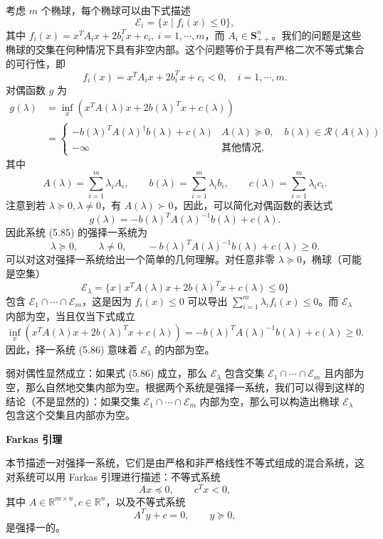 \documentclass[UTF8,12pt,a4paper,fontset=fandol]{ctexart}
\begin{document}
考虑 $m$ 个椭球，每个椭球可以由下式描述
\[
\mathcal{E}_i=\{x\mid f_i(x)\leq 0\},
\]
其中 $f_i(x)=x^TA_ix+2b_i^Tx+c_i,\ i=1,\cdots,m$，而 $A_i\in\mathbf{S}_{++}^n$。我们的问题是这些椭球的交集在何种情况下具有非空内部。这个问题等价于具有严格二次不等式集合的可行性，即
\begin{equation}
f_i(x)=x^TA_ix+2b_i^Tx+c_i<0,\quad i=1,\cdots,m.
\tag{5.85}
\end{equation}
对偶函数 $g$ 为
\[
\begin{aligned}
g(\lambda)
&=\inf_x\left(x^TA(\lambda)x+2b(\lambda)^Tx+c(\lambda)\right)\\
&=
\begin{cases}
-b(\lambda)^TA(\lambda)^\dagger b(\lambda)+c(\lambda) & A(\lambda)\succeq 0,\quad b(\lambda)\in\mathcal{R}(A(\lambda))\\
-\infty & \text{其他情况},
\end{cases}
\end{aligned}
\]
其中
\[
A(\lambda)=\sum_{i=1}^m\lambda_i A_i,\qquad
b(\lambda)=\sum_{i=1}^m\lambda_i b_i,\qquad
c(\lambda)=\sum_{i=1}^m\lambda_i c_i.
\]
注意到若 $\lambda\succeq 0,\lambda\neq 0$，有 $A(\lambda)\succ 0$，因此，可以简化对偶函数的表达式
\[
g(\lambda)=-b(\lambda)^TA(\lambda)^{-1}b(\lambda)+c(\lambda).
\]
因此系统 (5.85) 的强择一系统为
\begin{equation}
\lambda\succeq 0,\qquad \lambda\neq 0,\qquad -b(\lambda)^TA(\lambda)^{-1}b(\lambda)+c(\lambda)\geq 0.
\tag{5.86}
\end{equation}
可以对这对强择一系统给出一个简单的几何理解。对任意非零 $\lambda\succeq 0$，椭球（可能是空集）
\[
\mathcal{E}_\lambda=\{x\mid x^TA(\lambda)x+2b(\lambda)^Tx+c(\lambda)\leq 0\}
\]
包含 $\mathcal{E}_1\cap\cdots\cap\mathcal{E}_m$，这是因为 $f_i(x)\leq 0$ 可以导出 $\sum_{i=1}^m\lambda_i f_i(x)\leq 0$。而 $\mathcal{E}_\lambda$ 内部为空，当且仅当下式成立
\[
\inf_x\left(x^TA(\lambda)x+2b(\lambda)^Tx+c(\lambda)\right)
=-b(\lambda)^TA(\lambda)^{-1}b(\lambda)+c(\lambda)\geq 0.
\]
因此，择一系统 (5.86) 意味着 $\mathcal{E}_\lambda$ 的内部为空。

弱对偶性显然成立：如果式 (5.86) 成立，那么 $\mathcal{E}_\lambda$ 包含交集 $\mathcal{E}_1\cap\cdots\cap\mathcal{E}_m$ 且内部为空，那么自然地交集内部为空。根据两个系统是强择一系统，我们可以得到这样的结论（不是显然的）：如果交集 $\mathcal{E}_1\cap\cdots\cap\mathcal{E}_m$ 内部为空，那么可以构造出椭球 $\mathcal{E}_\lambda$ 包含这个交集且内部亦为空。

\noindent\textbf{Farkas 引理}

本节描述一对强择一系统，它们是由严格和非严格线性不等式组成的混合系统，这对系统可以用 Farkas 引理进行描述：不等式系统
\begin{equation}
Ax\preceq 0,\qquad c^Tx<0,
\tag{5.87}
\end{equation}
其中 $A\in\mathbb{R}^{m\times n},c\in\mathbb{R}^n$，以及不等式系统
\begin{equation}
A^Ty+c=0,\qquad y\succeq 0,
\tag{5.88}
\end{equation}
是强择一的。
\end{document}
